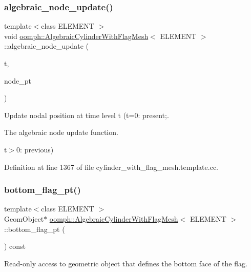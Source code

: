 \subsubsection{\texorpdfstring{algebraic\+\_\+node\+\_\+update()}{algebraic\_node\_update()}}
{\footnotesize\ttfamily template$<$class E\+L\+E\+M\+E\+NT $>$ \\
void \hyperlink{classoomph_1_1AlgebraicCylinderWithFlagMesh}{oomph\+::\+Algebraic\+Cylinder\+With\+Flag\+Mesh}$<$ E\+L\+E\+M\+E\+NT $>$\+::algebraic\+\_\+node\+\_\+update (\begin{DoxyParamCaption}\item[{const unsigned \&}]{t,  }\item[{Algebraic\+Node $\ast$\&}]{node\+\_\+pt }\end{DoxyParamCaption})}



Update nodal position at time level t (t=0\+: present;. 

The algebraic node update function.

t$>$0\+: previous) 

Definition at line 1367 of file cylinder\+\_\+with\+\_\+flag\+\_\+mesh.\+template.\+cc.

\mbox{\label{classoomph_1_1AlgebraicCylinderWithFlagMesh_a9c362fcc5edeb1b6e773f27a83778495}} 
\subsubsection{\texorpdfstring{bottom\+\_\+flag\+\_\+pt()}{bottom\_flag\_pt()}}
{\footnotesize\ttfamily template$<$class E\+L\+E\+M\+E\+NT $>$ \\
Geom\+Object$\ast$ \hyperlink{classoomph_1_1AlgebraicCylinderWithFlagMesh}{oomph\+::\+Algebraic\+Cylinder\+With\+Flag\+Mesh}$<$ E\+L\+E\+M\+E\+NT $>$\+::bottom\+\_\+flag\+\_\+pt (\begin{DoxyParamCaption}{ }\end{DoxyParamCaption}) const\hspace{0.3cm}{\ttfamily [inline]}}



Read-\/only access to geometric object that defines the bottom face of the flag. 



